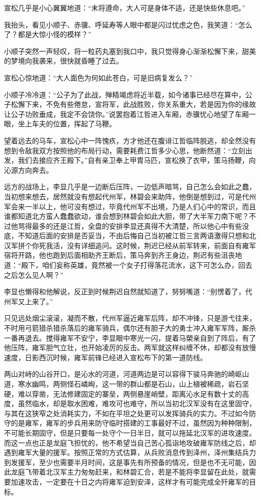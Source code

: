 宣松几乎是小心翼翼地道：“末将遵命，大人可是身体不适，还是快些休息吧。”

我抬头，看见小顺子、赤骥、呼延寿等人眼中都是闪过忧虑之色，我笑道：“怎么了？都是大惊小怪的模样？”

小顺子突然一声轻叹，将一粒药丸塞到我口中，我只觉得身心渐渐松懈下来，甜美的梦境向我袭来，很快就昏睡了过去。

宣松心惊地道：“大人面色为何如此苍白，可是旧病复发么？”

小顺子冷冷道：“公子为了此战，殚精竭虑将近半载，如今诸事已经尽在算中，公子松懈下来，不免有些倦怠，宣将军，此战胜败，你关系重大，若是因为你的缘故让公子功败垂成，我定不会饶你。”说罢抱着江哲进入车厢，赤骥忧心地望了车厢一眼，坐上车夫的位置，挥起了马鞭。

望着远去的马车，宣松心中一阵愧疚，方才他还在腹诽江哲临阵脱逃，却全然没有想到令敌我双方按照他的布局行动，需要耗费江哲多少心思，他断然道：“立刻出发，我们去接应齐王殿下。”自有亲卫奉上甲胄马匹，宣松换了衣甲，策马扬鞭，向沁源方向奔去。

远方的战场上，李显几乎是一边断后压阵，一边低声暗骂，自己怎么会如此之蠢，当初想来想去，居然就没有想起代州军，林碧会来助阵，他倒是想到过，可是代州军会来一半以上，他可没有想过，毕竟代州军不出境，乃是人们心中的常识，而且谁都知道北方蛮人蠢蠢欲动，谁会想到林碧会如此大胆，带了大半军力南下呢？不过他骂得最多的还是江哲，全盘的安排李显还真得不大清楚，所以他心中有些没底，不知道后面的安排是否妥当，不由后悔自己当初被江哲三言两语激得只想和北汉军拼个你死我活，没有详细追问。这时候，荆迟已经从前军转来，前面自有雍军宿将开路，他也跑到后面相助齐王断后，策马奔到齐王身边，荆迟有些沮丧地道：“殿下，咱们妄称英雄，竟然被一个女子打得落花流水，这下可怎么办，回去之后怎么见人啊？”

李显也懒得和他解说，反正到时候荆迟自然就知道了，努努嘴道：“别愣着了，代州军又上来了。”

只见远处烟尘滚滚，凝而不散，代州军逼近雍军后阵，却不冲锋，只是游弋往来，不时用弓箭猎杀猎杀落后的雍军骑兵，偶尔还有胆子大的勇士冲入雍军军阵，厮杀一番再退去。搅得雍军不安宁，李显眼中寒光一闪，提着马槊亲自到了阵后，有了他压阵，雍军胆气立壮，也开始凌厉的反击。两军就这样纠缠不休，却都没有放慢速度，日影西沉时候，雍军前锋已经进入宣松布下的第一道防线。

两山对峙的山谷开口，是沁水的河道，河道两边是可以容得下骏马奔驰的崎岖山道，寒水幽鸣，两侧怪石嶙峋，这一带的群山都是石山，山上植被稀疏，岩石坚硬，难以穿凿，无法修建固定的寨垒，两侧悬崖峭壁，距离沁水足有数十丈的高度，虽然临水，却是取水困难，难攻可也难守，所以当初北汉军没有在这里固守，与其在这狭窄之处消耗实力，不如在平坦之处更可以发挥骑兵的实力。不过如今防守的是雍军，雍军的步兵用来防守临时搭建的工事最好不过，虽然因为种种限制，不可能长期固守，但是只要每一处守个一日半日，就可以拖延北汉军的进攻速度。而这一点也正是龙庭飞担忧的，他不希望当自己苦心孤诣地攻破雍军防线之后，却遇到雍军大量的援军。按照正常的方式估算，从兵败消息传到泽州，泽州集结兵力到发援军，至少也需要半月时间，这是事先有所预备的情况，但是也不无可能，因此龙庭飞带着北汉军主力匆匆赶来，和林碧汇合，若是不能将李显留在此处，就需要加速攻击，一定要在十日之内将雍军迫到安泽，这样才有可能完成全歼雍军的目标。

